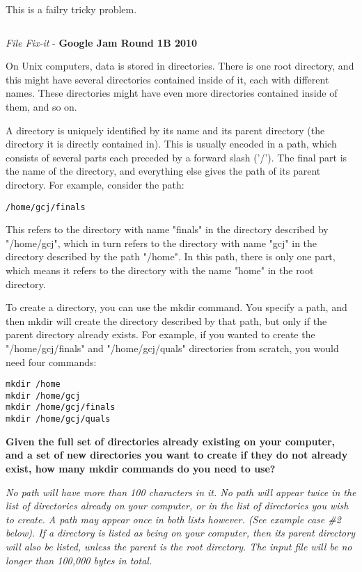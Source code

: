 \begin{solution}
	
This is a failry tricky problem.
	\begin{lstlisting}[language=c++, caption="Store credit c++ solution"]


	\end{lstlisting}
\end{solution}



\begin{problem}{\textit{File Fix-it} - \textbf{Google Jam Round 1B 2010}}

On Unix computers, data is stored in directories. There is one root directory, and this might have several directories contained inside of it, each with different names. These directories might have even more directories contained inside of them, and so on.

A directory is uniquely identified by its name and its parent directory (the directory it is directly contained in). This is usually encoded in a path, which consists of several parts each preceded by a forward slash ('/'). The final part is the name of the directory, and everything else gives the path of its parent directory. For example, consider the path:

\texttt{/home/gcj/finals}

This refers to the directory with name "finals" in the directory described by "/home/gcj", which in turn refers to the directory with name "gcj" in the directory described by the path "/home". In this path, there is only one part, which means it refers to the directory with the name "home" in the root directory.

To create a directory, you can use the mkdir command. You specify a path, and then mkdir will create the directory described by that path, but only if the parent directory already exists. For example, if you wanted to create the "/home/gcj/finals" and "/home/gcj/quals" directories from scratch, you would need four commands:
	\begin{verbatim}
mkdir /home
mkdir /home/gcj
mkdir /home/gcj/finals
mkdir /home/gcj/quals
	\end{verbatim}

\textbf{Given the full set of directories already existing on your computer, and a set of new directories you want to create if they do not already exist, how many mkdir commands do you need to use?}

\textit{No path will have more than 100 characters in it.
No path will appear twice in the list of directories already on your computer, or in the list of directories you wish to create. A path may appear once in both lists however. (See example case \#2 below).
If a directory is listed as being on your computer, then its parent directory will also be listed, unless the parent is the root directory.
The input file will be no longer than 100,000 bytes in total.
}


\end{problem}
